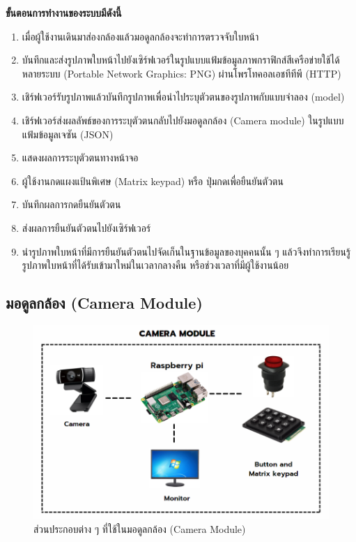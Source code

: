\textbf{ขั้นตอนการทำงานของระบบมีดังนี้}
\begin{enumerate}
  \item เมื่อผู้ใช้งานเดินมาส่องกล้องแล้วมอดูลกล้องจะทำการตรวจจับใบหน้า
  \item บันทึกและส่งรูปภาพใบหน้าไปยังเซิร์ฟเวอร์ในรูปแบบแฟ้มข้อมูลภาพกราฟิกส์สีเครือข่ายใช้ได้หลายระบบ (Portable Network Graphics: PNG) 
        ผ่านโพรโทคอลเอชทีทีพี (HTTP)
  \item เชิร์ฟเวอร์รับรูปภาพแล้วบันทึกรูปภาพเพื่อนำไประบุตัวตนของรูปภาพกับแบบจำลอง (model)
  \item เชิร์ฟเวอร์ส่งผลลัพธ์ของการระบุตัวตนกลับไปยังมอดูลกล้อง (Camera module) ในรูปแบบแฟ้มข้อมูลเจซัน (JSON)
  \item แสดงผลการระบุตัวตนทางหน้าจอ
  \item ผู้ใช้งานกดแผงแป้นพิเศษ (Matrix keypad) หรือ ปุ่มกดเพื่อยืนยันตัวตน
  \item บันทึกผลการกดยืนยันตัวตน
  \item ส่งผลการยืนยันตัวตนไปยังเซิร์ฟเวอร์
  \item นำรูปภาพใบหน้าที่มีการยืนยันตัวตนไปจัดเก็นในฐานข้อมูลของบุคคนนั้น ๆ แล้วจึงทำการเรียนรู้รูปภาพใบหน้าที่ได้รับเข้ามาใหม่ในเวลากลางคืน หรือช่วงเวลาที่มีผู้ใช้งานน้อย
\end{enumerate}

\subsection{มอดูลกล้อง (Camera Module)}

\begin{figure}[ht!]
  \begin{center}
    \includegraphics[scale=.45]{pic/camera_module.png}
    \caption[ส่วนประกอบต่าง ๆ ที่ใช้ในมอดูลกล้อง (Camera Module)]{ส่วนประกอบต่าง ๆ ที่ใช้ในมอดูลกล้อง (Camera Module)}
    \label{fig:camera}
  \end{center}
\end{figure}

